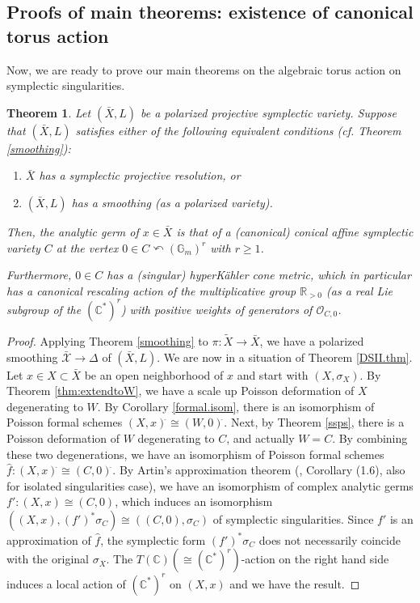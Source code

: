 \documentclass[12pt,a4paper]{amsart}
\newtheorem{Thm}{Theorem}[section]
\theoremstyle{remark}
\theoremstyle{definition}
\def\R{\mathbb{R}}
\def\C{\mathbb{C}}
\begin{document}

\subsection{Proofs of main theorems: existence of canonical 
torus action}\label{subsec:6.2}

Now, we are ready to prove 
our main theorems on the 
algebraic torus action 
on symplectic singularities. 

\begin{Thm}\label{Mthm}
Let $(\bar{X},L)$ be a polarized 
projective symplectic variety.  Suppose that 
$(\bar{X},L)$
satisfies either of the  following equivalent conditions  (cf. Theorem \ref{smoothing}): 
\begin{enumerate}
\item $\bar{X}$ has a 
symplectic projective resolution, or 
\item \label{1.1ii.sec6} $(\bar{X},L)$ has a smoothing (as a polarized variety). 
\end{enumerate}


Then, the analytic germ of $x\in \bar{X}$ is that of a 
(canonical) 
conical affine symplectic variety $C$ at the vertex $0\in C\curvearrowleft (\mathbb{G}_m)^r$ with $r\ge 1$. 

Furthermore, $0\in C$ has a (singular) hyperK\"ahler cone  metric, %
which in particular has a canonical rescaling action of 
the multiplicative group $\R_{>0}$ (as a real Lie subgroup of the $(\C^*)^r$) with positive weights 
of generators of $\mathcal{O}_{C,0}$.

\end{Thm}

\begin{proof}
Applying Theorem \ref{smoothing} to $\pi\colon \tilde{X} \to \bar{X}$, we have a polarized smoothing 
$\bar{\mathcal X} \to \Delta$ 
of $(\bar{X}, L)$. We are now in a situation of Theorem \ref{DSII.thm}. Let $x \in X \subset \bar{X}$ be an open neighborhood of $x$ and start with $(X, \sigma_X)$. By Theorem 
\ref{thm:extendtoW}, we have a scale up Poisson deformation of $X$ degenerating to $W$. By Corollary \ref{formal.isom}, there is an isomorphism of Poisson formal schemes 
$(X, x)^{\hat{}} \cong (W, 0)^{\hat{}}$. Next, by Theorem 
\ref{ssps}, there is a Poisson deformation of $W$ degenerating to $C$, and actually $W = C$. 
By combining these two degenerations, we have an isomorphism of Poisson formal schemes $\hat{f}: (X, x)^{\hat{}} \cong (C, 0)^{\hat{}}$. By Artin's approximation theorem (\cite{Artin}, Corollary (1.6), 
also \cite{HironakaRossi} for isolated singularities case), we have an isomorphism of complex analytic germs $f': (X, x) \cong (C, 0)$, which induces an isomorphism 
$((X, x), (f')^*\sigma_C) \cong 
((C,0), \sigma_C)$ of symplectic singularities. Since $f'$ is an approximation of $\hat{f}$, the symplectic form $(f')^*\sigma_C$ 
does not necessarily coincide with the original $\sigma_X$. 
The $T(\mathbb{C}) (\cong (\mathbb{C}^*)^r)$-action on the right hand side induces a local action of $(\mathbb{C}^*)^r$ on 
$(X, x)$ and we have the result. 
\end{proof}
\end{document}
